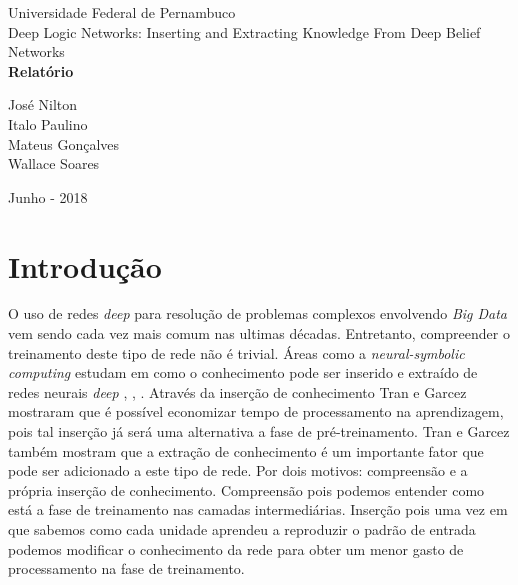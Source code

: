 \documentclass[a4paper, 12pt]{article}
\begin{document}
\sloppy
\begin{titlepage}
  \begin{center}
      \Huge{Universidade Federal de Pernambuco}\\
      \large{Deep Logic Networks: Inserting and Extracting
Knowledge From Deep Belief Networks}\\ 
      \vspace{15pt}
      \vspace{95pt}
      \textbf{\LARGE{Relatório}}\\
      \vspace{3,5cm}
  \end{center}

  \begin{flushleft}
      \begin{tabbing}
                  José Nilton\\
                  Italo Paulino\\
                  Mateus Gonçalves\\ 
                  Wallace Soares\\
      \end{tabbing}
  \end{flushleft}
  \vspace{1cm}

  \begin{center}
      \vspace{\fill}
      Junho - 2018\\
  \end{center}
\end{titlepage}
\newpage
\tableofcontents
\thispagestyle{empty}
\newpage
{}
\section{Introdução}
O uso de redes \textit{deep} para resolução de problemas complexos envolvendo \textit{Big Data} vem sendo cada vez mais comum nas ultimas décadas. Entretanto, compreender o treinamento deste tipo de rede não é trivial. Áreas como a \textit{neural-symbolic computing} estudam em como o conhecimento pode ser inserido e extraído de redes neurais \textit{deep} \cite{Tran}, \cite{garbook}, \cite{garConf}. Através da inserção de conhecimento Tran e Garcez \cite{Tran} mostraram que é possível economizar tempo de processamento na aprendizagem, pois tal inserção já será uma alternativa a fase de pré-treinamento.
Tran e Garcez também mostram que a extração de conhecimento é um importante fator que pode ser adicionado a este tipo de rede. Por dois motivos: compreensão e a própria inserção de conhecimento. Compreensão pois podemos entender como está a fase de treinamento nas camadas intermediárias. Inserção pois uma vez em que sabemos como cada unidade aprendeu a reproduzir o padrão de entrada podemos modificar o conhecimento da rede para obter um menor gasto de processamento na fase de treinamento.
\end{document}
